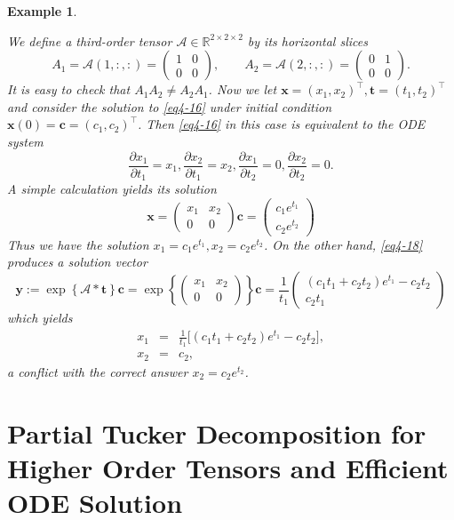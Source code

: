 \documentclass[11pt, oneside]{article}  %
\newtheorem{exm}[thm]{Example}
\newcommand{\partl}{\partial}
\newcommand{\set}[1]{\left\{#1\right\}}
\newcommand{\RR}{\mathbb{R}}
\newcommand{\A}{\mathcal{A}}
\newcommand{\bft}{\textbf{t}}
\newcommand{\bx}{\textbf{x}}
\newcommand{\by}{\textbf{y}}
\newcommand{\bfc}{\textbf{c}}
\newcommand{\beq}{\begin{equation}}
\newcommand{\eeq}{\end{equation}}
\newcommand{\beyy}{\begin{eqnarray*}}
\newcommand{\eeyy}{\end{eqnarray*}}
\begin{document}
\begin{exm}\label{exm4-1}

We define a third-order tensor $\A\in\RR^{2\times2\times2}$ by its horizontal slices 
\[
A_1 =\A(1,:,:)= \begin{pmatrix}1&0\\0&0\end{pmatrix},\qquad
A_2 =\A(2,:,:)= \begin{pmatrix}0&1\\0&0\end{pmatrix}.
\]
It is easy to check that $A_{1}A_{2}\neq A_{2}A_{1}$.  Now we let $\bx=(x_1,x_2)^\top, \bft =(t_{1},t_{2})^{\top}$ and consider the solution to \eqref{eq4-16} under initial condition $\bx(0) = \bfc =(c_{1},c_{2})^{\top}$.  Then \eqref{eq4-16} in this case is equivalent to the ODE system 
\beq\label{eq:ex4-7:ode}
\frac{\partl x_{1}}{\partl t_{1}}=x_{1}, \frac{\partl x_{2}}{\partl t_{1}} = x_{2}, 
\frac{\partl x_{1}}{\partl t_{2}}=0,  \frac{\partl x_{2}}{\partl t_{2}} = 0. 
\eeq 
A simple calculation yields its solution 
\beq\label{eq:ex4-7:sol}
 \bx = \begin{pmatrix}x_1 & x_2\\0&0\end{pmatrix}\bfc =  \begin{pmatrix} c_1e^{t_1} \\ c_2e^{t_2} \end{pmatrix}
\eeq
Thus we have the solution $x_{1} = c_1e^{t_1}, x_{2} = c_2e^{t_2}$.  On the other hand, \eqref{eq4-18} produces a solution vector 
\[
\by:=\exp\set{\A\ast\bft}\bfc = \exp\set{\begin{pmatrix}x_1 & x_2\\0&0\end{pmatrix}}\bfc 
= \frac{1}{t_{1}}\begin{pmatrix} (c_1t_1+c_2t_2)e^{t_1}- c_2 t_2 \\ c_2 t_1 \end{pmatrix}
\]
which yields 
\beyy 
x_{1} &=& \frac{1}{t_{1}} \bigl[(c_1t_1+c_2t_2)e^{t_1}- c_2 t_2\bigr], \\
x_{2} &=& c_{2},
\eeyy
a conflict with the correct answer $x_{2} = c_2e^{t_2}$.  
\end{exm}

\vskip 5pt
\section{Partial Tucker Decomposition for Higher Order Tensors and Efficient ODE Solution}
\label{sec5}
\setcounter{equation}{0}
\end{document}

